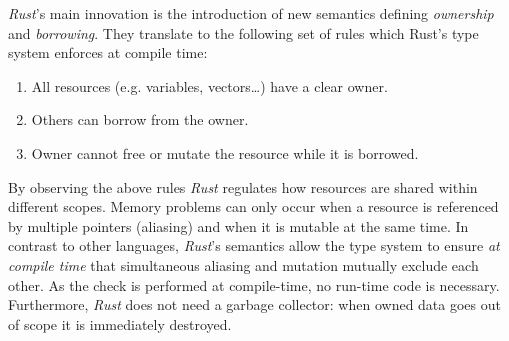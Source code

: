 \emph{Rust}'s main innovation is the introduction of new semantics
defining \emph{ownership} and \emph{borrowing}. They translate to the
following set of rules which Rust's type system enforces at compile
time:

\begin{enumerate}
\def\labelenumi{\arabic{enumi}.}
\item
  All resources (e.g. variables, vectors\ldots{}​) have a clear owner.
\item
  Others can borrow from the owner.
\item
  Owner cannot free or mutate the resource while it is borrowed.
\end{enumerate}

By observing the above rules \emph{Rust} regulates how resources are
shared within different scopes. Memory problems can only occur when a
resource is referenced by multiple pointers (aliasing) and when it is
mutable at the same time. In contrast to other languages, \emph{Rust}'s
semantics allow the type system to ensure \emph{at compile time} that
simultaneous aliasing and mutation mutually exclude each other. As the
check is performed at compile-time, no run-time code is necessary.
Furthermore, \emph{Rust} does not need a garbage collector: when owned
data goes out of scope it is immediately destroyed.


